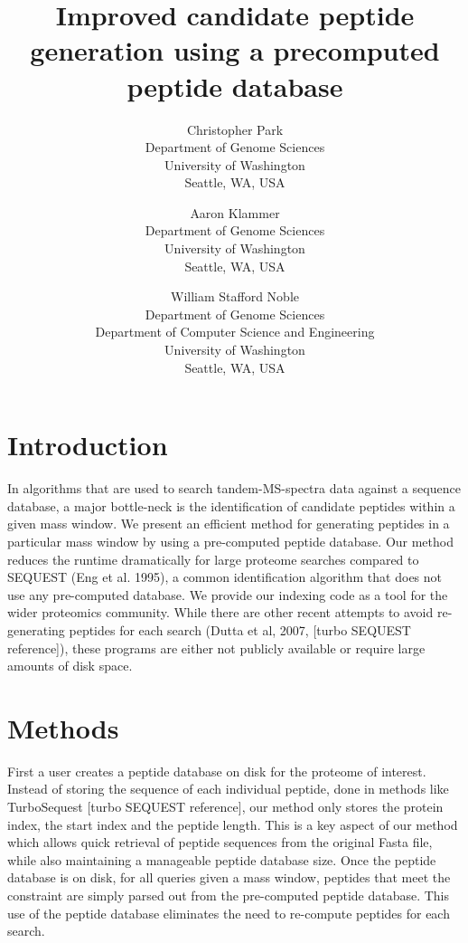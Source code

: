 \documentclass[12pt]{article}
\begin{document}
\title{Improved candidate peptide generation using a precomputed
peptide database}

\author{
Christopher Park\\
Department of Genome Sciences\\
University of Washington\\
Seattle, WA, USA
\and
Aaron Klammer\\
Department of Genome Sciences\\
University of Washington\\
Seattle, WA, USA
\and
William Stafford Noble\\
Department of Genome Sciences\\
Department of Computer Science and Engineering\\
University of Washington\\
Seattle, WA, USA
}

\maketitle

\section{Introduction}

In algorithms that are used to search
tandem-MS-spectra data against a sequence database, a major bottle-neck is
the identification of candidate peptides within a given mass window. We
present an efficient method for generating peptides in a particular mass
window by using a pre-computed peptide database. Our method reduces the
runtime dramatically for large proteome searches compared to SEQUEST
(Eng et al. 1995), a common identification algorithm that does not use
any pre-computed database. We provide our indexing code as a tool for
the wider proteomics community. While there are other recent attempts
to avoid re-generating peptides for each search (Dutta et al, 2007,
[turbo SEQUEST reference]), these programs are either not publicly
available or require large amounts of disk space.

\section{Methods}

 First a user creates a peptide database on
disk for the proteome of interest. Instead of storing the sequence of
each individual peptide, done in methods like TurboSequest [turbo SEQUEST
reference], our method only stores the protein index, the start index
and the peptide length. This is a key aspect of our method which allows
quick retrieval of peptide sequences from the original Fasta file, while
also maintaining a manageable peptide database size.  Once the peptide
database is on disk, for all queries given a mass window, peptides
that meet the constraint are simply parsed out from the pre-computed
peptide database. This use of the peptide database eliminates the need
to re-compute peptides for each search.
\end{document}
